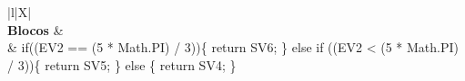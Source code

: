 \begin{xltabular}{\textwidth}{|l|X|}
		 \\ \hline
		\textbf{Blocos} &  \\ \hline
		 & if((EV2 == (5 * Math.PI) / 3))\{   return SV6; \} else if ((EV2 < (5 * Math.PI) / 3))\{   return SV5; \} else \{   return SV4; \} \\ \hline



\end{xltabular}
